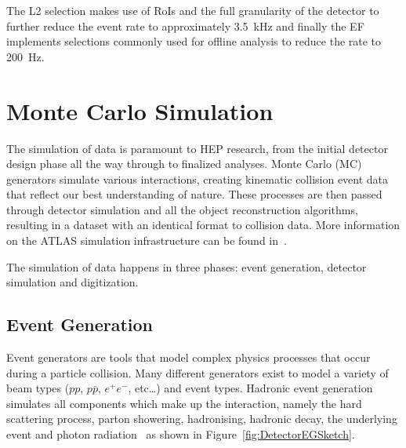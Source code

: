 The L2 selection makes use of RoIs and the full granularity of the detector to further reduce the event rate to approximately \SI{3.5}{\kHz} and finally the EF implements selections commonly used for offline analysis to reduce the rate to \SI{200}{\Hz}.



\section{Monte Carlo Simulation} \label{DetectorMC}

The simulation of data is paramount to HEP research, from the initial detector design phase all the way through to finalized analyses. Monte Carlo (MC) generators simulate various interactions, creating kinematic collision event data that reflect our best understanding of nature. These processes are then passed through detector simulation and all the object reconstruction algorithms, resulting in a dataset with an identical format to collision data. More information on the ATLAS simulation infrastructure can be found in~\cite{Detector:ATLASSimulationInfra}.

The simulation of data happens in three phases: event generation, detector simulation and digitization. 

\subsection{Event Generation} \label{DetectorEventGeneration}

Event generators are tools that model complex physics processes that occur during a particle collision. Many different generators exist to model a variety of beam types ($pp$, $p\bar{p}$, $e^+e^-$, etc\ldots) and event types. Hadronic event generation simulates all components which make up the interaction, namely the hard scattering process, parton showering, hadronising, hadronic decay, the underlying event and photon radiation~\cite{Les} as shown in Figure~\ref{fig:DetectorEGSketch}.

